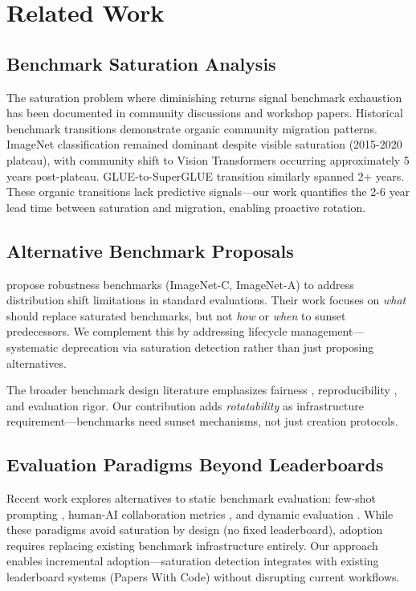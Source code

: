 \section{Related Work}

\subsection{Benchmark Saturation Analysis}

The saturation problem where diminishing returns signal benchmark exhaustion has been documented in community discussions and workshop papers. Historical benchmark transitions demonstrate organic community migration patterns. ImageNet classification remained dominant despite visible saturation (2015-2020 plateau), with community shift to Vision Transformers occurring approximately 5 years post-plateau. GLUE-to-SuperGLUE transition similarly spanned 2+ years. These organic transitions lack predictive signals---our work quantifies the 2-6 year lead time between saturation and migration, enabling proactive rotation.

\subsection{Alternative Benchmark Proposals}

\citet{Hendrycks2019Robustness} propose robustness benchmarks (ImageNet-C, ImageNet-A) to address distribution shift limitations in standard evaluations. Their work focuses on \emph{what} should replace saturated benchmarks, but not \emph{how} or \emph{when} to sunset predecessors. We complement this by addressing lifecycle management---systematic deprecation via saturation detection rather than just proposing alternatives.

The broader benchmark design literature emphasizes fairness \cite{Gebru2018Datasheets}, reproducibility \cite{Pineau2021Reproducibility}, and evaluation rigor. Our contribution adds \emph{rotatability} as infrastructure requirement---benchmarks need sunset mechanisms, not just creation protocols.

\subsection{Evaluation Paradigms Beyond Leaderboards}

Recent work explores alternatives to static benchmark evaluation: few-shot prompting \cite{brown2020language}, human-AI collaboration metrics \cite{bansal2021humanai}, and dynamic evaluation \cite{nie2020dynamic}. While these paradigms avoid saturation by design (no fixed leaderboard), adoption requires replacing existing benchmark infrastructure entirely. Our approach enables incremental adoption---saturation detection integrates with existing leaderboard systems (Papers With Code) without disrupting current workflows.

